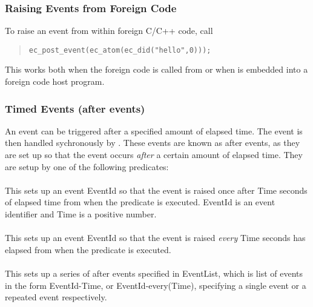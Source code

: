 \subsubsection{Raising Events from Foreign Code}
To raise an event from within foreign C/C++ code, call
\begin{quote}\begin{verbatim}
ec_post_event(ec_atom(ec_did("hello",0)));
\end{verbatim}\end{quote}
This works both when the foreign code is called from {\eclipse} or when
{\eclipse} is embedded into a foreign code host program.


\subsubsection{Timed Events (after events)}

An event can be triggered after a specified amount
of elapsed time. The event is then handled sychronously by {\eclipse}.
These events are known as after
events, as they are set up so that the event occurs {\it after\/} a
certain amount of elapsed time.
They are setup by one of the following predicates:

\paragraph{}
This sets up an event EventId so that the event is raised once after Time seconds
of elapsed time from when the predicate is executed. EventId is an event
identifier and Time is a positive number.

\paragraph{} 
This sets up an event EventId so
that the event is raised {\it every\/} Time seconds has elapsed from when
the predicate is executed.

\paragraph{}
This sets up a series of after events specified in EventList, which is list
of events in the form EventId-Time, or EventId-every(Time), specifying a single
event or a repeated event respectively.

